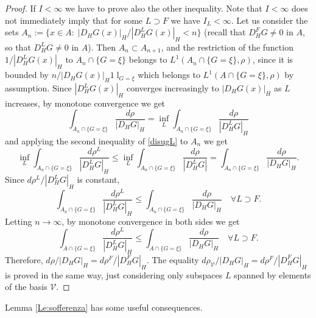 \documentclass[reqno,twoside,12pt]{amsart}
\begin{document}
\begin{proof}
If  $I <\infty$ we have to prove also the other inequality.  
Note that  $I <\infty$ does not immediately imply that 
for some   $L\supset F$ we have
$I_L <\infty$. Let us consider the sets $A_n:=\{ x\in A:\; |D_H G(x)|_H/|D_H^LG(x)|_H <n\}$ (recall that $D^F_HG \neq 0$ in $A$, so that $D^L_HG \neq 0$ in $A$). Then  $A_n\subset A_{n+1}$,  and the restriction of the function $1/|D_H^LG(x)|_H$ to  $A_n \cap \{G = \xi\}$ belongs to $L^1(A_n \cap \{G = \xi\},\rho)$, since it is bounded by $n/ |D_H G(x)|_H{1\!\!\!\;\mathrm{l}}_{G=\xi}$ which belongs to $L^1(A \cap \{G = \xi\}, \rho)$ by assumption. Since  $|D_H^LG(x)|_H$ converges increasingly to  $|D_HG(x)|_H$ as  $L$ increases, by monotone convergence we get
$$\int_{A_n \cap \{G = \xi\}} \frac{d\rho }{|D_H G|_H} = \inf_{L} \int_{A _n\cap \{G = \xi\}} \frac{d\rho }{|D_H^LG|_H}$$
and applying  the second inequality of \eqref{disugL} to $A_n$ we get
$$\inf_L \int_{A _n\cap \{G = \xi\}} \frac{d\rho^L}{|D_H^LG|_H} \leq  \inf_{L} \int_{A _n\cap \{G = \xi\}} \frac{d\rho }{|D_H^LG|} = \int_{A_n \cap \{G = \xi\}} \frac{d\rho }{|D_H G|_H}. $$
Since  $d\rho^L/|D_H^LG|_H$ is constant, 
$$\int_{A _n\cap \{G = \xi\}} \frac{d\rho^L}{|D_H^LG|_H} \leq \int_{A_n \cap \{G = \xi\}} \frac{d\rho }{|D_H G|_H}\quad \forall L\supset F.$$
Letting $n\to \infty$, by monotone convergence in both sides we get 
$$\int_{A  \cap \{G = \xi\}} \frac{d\rho^L}{|D_H^LG|_H} \leq \int_{A  \cap \{G = \xi\}} \frac{d\rho }{|D_H G|_H}\quad \forall L\supset F.$$
Therefore, $d\rho/|D_H G|_H = d\rho^F/|D_H^FG|_H$. The equality $d\rho_{\mathcal V}/|D_H G|_H = d\rho^F/|D_H^FG|_H$ is proved in the same way, just considering only subspaces $L$ spanned by elements of the basis $\mathcal V$.  
\end{proof}

Lemma \ref{Le:sofferenza} has some useful  consequences. 
\end{document}
